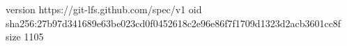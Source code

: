 version https://git-lfs.github.com/spec/v1
oid sha256:27b97d341689e63be023cd0f0452618c2e96e86f7f1709d1323d2acb3601cc8f
size 1105
